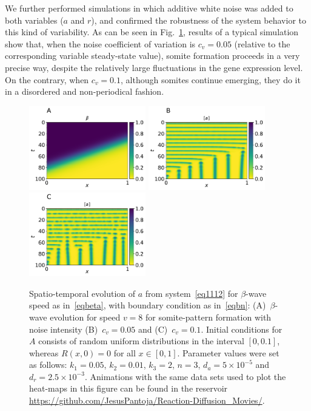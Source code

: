 \documentclass[%
 preprint,
 aip, 
 amsmath,amssymb,
]{revtex4-2}
\begin{document}
	We further performed simulations in which additive white noise was added to
	both variables ($a$ and $r$), and confirmed the robustness of the system
	behavior to this kind of variability. As can be seen in Fig.~\ref{Fig05},
	results of a typical simulation show that, when the noise coefficient of
	variation is $c_v = 0.05$ (relative to the corresponding variable 
	steady-state value), somite formation proceeds in a very precise way,
	despite the relatively large fluctuations in the gene expression level. On the
	contrary, when $c_v = 0.1$, although somites continue emerging, they do it in 
	a disordered and non-periodical fashion.
	
	\begin{figure}[t!]
		\centering
		\includegraphics[width=2in]{Figures/Fig05aRev.pdf}
		\includegraphics[width=2in]{Figures/Fig05bRev.pdf} 
		\includegraphics[width=2in]{Figures/Fig05cRev.pdf} 
		\caption{Spatio-temporal evolution of $a$ from system~\eqref{eq1112} for
			$\beta$-wave speed as in~\eqref{eqbeta}, with boundary condition as
			in~\eqref{eqbn}: (A)~$\beta$-wave evolution for speed $v=8$ for somite-pattern
			formation with noise intensity (B)~$c_v=0.05$ and (C)~$c_v=0.1$. Initial
			conditions for $A$ consists of random uniform distributions in the interval $[0,
			0.1]$, whereas $R(x, 0) = 0$ for all $x\in[0,1]$. Parameter values were set as
			follows: $k_1=0.05$, $k_2=0.01$, $k_3=2$, $n=3$,  $d_a = 5\times10^{-5}$
			and~$d_r=2.5\times10^{-3}$. Animations with the same 
			data sets used to plot the heat-maps in this figure can be found in the 
			reservoir \url{https://github.com/JesusPantoja/Reaction-Diffusion_Movies/}.}
		\label{Fig05}
	\end{figure}
	
\end{document}
